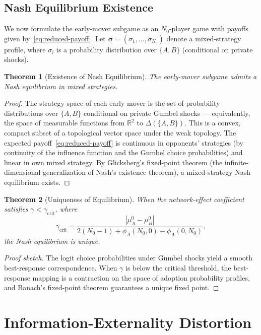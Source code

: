 \documentclass[12pt,a4paper]{article}
\newtheorem{theorem}{Theorem}[section]
\newcommand{\R}{\mathbb{R}}
\begin{document}
\subsection{Nash Equilibrium Existence}

We now formulate the early-mover subgame as an $N_0$-player game with
payoffs given by~\eqref{eq:reduced-payoff}.  Let
$\boldsymbol{\sigma}=(\sigma_1,\dots,\sigma_{N_0})$ denote a mixed-strategy
profile, where $\sigma_i$ is a probability distribution over $\{A,B\}$
(conditional on private shocks).

\begin{theorem}[Existence of Nash Equilibrium]
\label{thm:existence}
The early-mover subgame admits a Nash equilibrium in mixed strategies.
\end{theorem}

\begin{proof}
The strategy space of each early mover is the set of probability distributions over $\{A,B\}$ conditional on private Gumbel shocks --- equivalently, the space of measurable functions from $\R^2$ to $\Delta(\{A,B\})$. This is a convex, compact subset of a topological vector space under the weak topology. The expected payoff~\eqref{eq:reduced-payoff} is continuous in opponents' strategies (by continuity of the influence function and the Gumbel choice probabilities) and linear in own mixed strategy. By Glicksberg's fixed-point theorem (the infinite-dimensional generalization of Nash's existence theorem), a mixed-strategy Nash equilibrium exists.
\end{proof}

\begin{theorem}[Uniqueness of Equilibrium]
\label{thm:uniqueness}
When the network-effect coefficient satisfies $\gamma < \gamma_{\text{crit}}$, where
\[
\gamma_{\text{crit}} = \frac{|\mu_A^0 - \mu_B^0|}{2(N_0-1) + \phi_A(N_0,0) - \phi_A(0,N_0)},
\]
the Nash equilibrium is unique.
\end{theorem}

\begin{proof}[Proof sketch]
The logit choice probabilities under Gumbel shocks yield a smooth best-response correspondence. When $\gamma$ is below the critical threshold, the best-response mapping is a contraction on the space of adoption probability profiles, and Banach's fixed-point theorem guarantees a unique fixed point.
\end{proof}

\section{Information-Externality Distortion}
\end{document}
